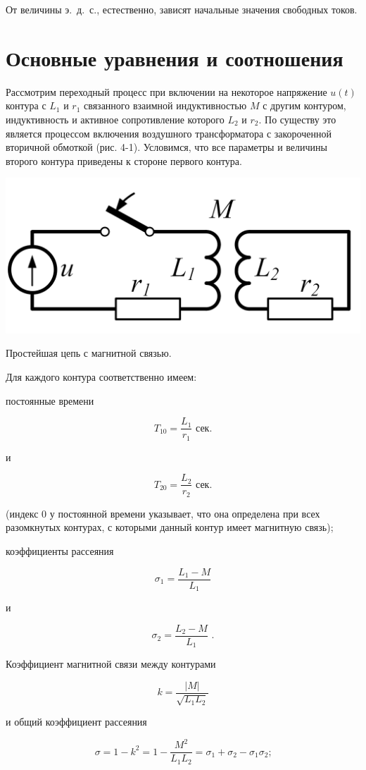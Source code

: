 От величины э.~д.~с., естественно, зависят начальные значения свободных токов.

\section{Основные уравнения и соотношения}
\label{sec:4-2}

Рассмотрим переходный процесс при включении на некоторое напряжение $ u(t) $ контура с $ L_1 $ и $ r_1 $ связанного взаимной индуктивностью $ M $ с другим контуром, индуктивность и активное сопротивление которого $ L_2 $ и $ r_2 $. По существу это является процессом включения воздушного трансформатора с закороченной вторичной обмоткой (рис. 4-1). Условимся, что все параметры и величины второго контура приведены к стороне первого контура.

\begin{floatingfigure}[lflt]{0.45\linewidth}
	\centering
	\includegraphics[width=0.40\linewidth]{pic/4-1}
	\caption{Простейшая цепь с магнитной связью.}
	\label{ris:4-1 simplest_circut}
\end{floatingfigure}

Для каждого контура соответственно имеем:

постоянные времени

$$ T_{10} = \frac{L_1}{r_1}\text{~сек.} $$

и

$$ T_{20} = \frac{L_2}{r_2}\text{~сек.}$$

(индекс 0 у постоянной времени указывает, что она определена при всех разомкнутых контурах, с которыми данный контур имеет магнитную связь);

коэффициенты рассеяния

$$ \sigma_1 = \frac{L_1 - M}{L_1} $$

и

$$ \sigma_2 = \frac{L_2 - M}{L_1}\text{~.} $$

Коэффициент магнитной связи между контурами

$$ k = \frac{|M|}{\sqrt{L_1 L_2}} $$

и общий коэффициент рассеяния

\begin{equation}
	\sigma = 1 - k^2 = 1 - \frac{M^2}{L_1 L_2} = \sigma_1 + \sigma_2 - \sigma_1 \sigma_2\text{;}
	\label{eq:4-1 sigma}
\end{equation}

